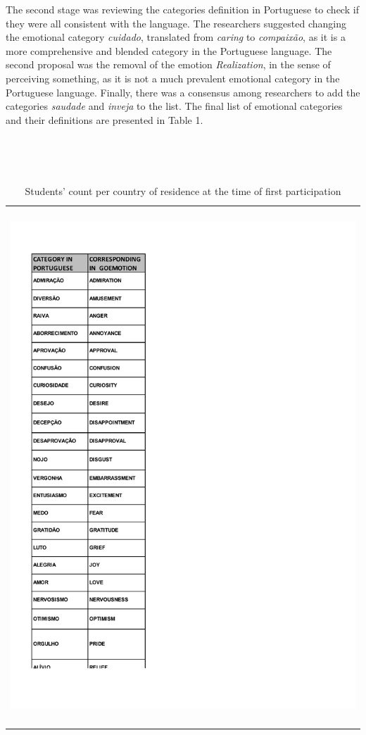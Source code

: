 \documentclass[12pt]{article}
\begin{document}
The second stage was reviewing the categories definition in Portuguese to check if they were all consistent with the language. The researchers suggested changing the emotional category \textit{cuidado}, translated from \textit{caring} to \textit{compaixão}, as it is a more comprehensive and blended category in the Portuguese language. The second proposal was the removal of the emotion \textit{Realization}, in the sense of perceiving something, as it is not a much prevalent emotional category in the Portuguese language. Finally, there was a consensus among researchers to add the categories \textit{saudade} and \textit{inveja} to the list. The final list of emotional categories and their definitions are presented in Table 1.

\begin{table}
  \caption{Students' count per country of residence at the time of first participation}
  \label{tab:sts_by_countries}
  \begin{tabularx}{\textwidth}{X}
    \includegraphics[trim=0cm 6.5cm 2cm 3.3cm, clip, width=\textwidth]{img-n-tables/EMOCOES}
  \end{tabularx}
\end{table}
\end{document}

